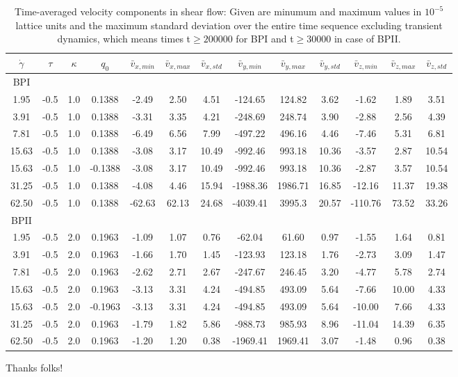 \documentclass[aps,pre,onecolumn,groupedaddress]{revtex4-1}
\begin{document}
\appendix*

\begin{table}
\begin{tabular}{|c|| c | c| c || c |c |c||c| c| c||c| c| c|}
\hline
$\dot{\gamma}$ & $\tau$ & $\kappa$ & $q_0$ & $\bar{v}_{x,min}$ & $\bar{v}_{x,max}$ & $\bar{v}_{x,std}$ & $\bar{v}_{y,min}$ & $\bar{v}_{y,max}$ & $\bar{v}_{y,std}$ & $\bar{v}_{z,min}$ & $\bar{v}_{z,max}$ & $\bar{v}_{z,std}$ \\
\hline
BPI \\
\hline
1.95 & -0.5 & 1.0 &0.1388 & -2.49 &2.50 &4.51 &-124.65 &124.82 &3.62 &-1.62 &1.89 &3.51 \\
3.91 & -0.5 & 1.0 &0.1388 & -3.31 &3.35 &4.21 &-248.69 &248.74 &3.90 &-2.88 &2.56 &4.39 \\
7.81 & -0.5 & 1.0 &0.1388 &-6.49 &6.56 &7.99 &-497.22 &496.16 &4.46 &-7.46 &5.31 &6.81 \\ 
15.63 & -0.5 & 1.0 &0.1388 &-3.08 &3.17 &10.49 &-992.46 &993.18 &10.36 &-3.57 &2.87 &10.54 \\
15.63 & -0.5 & 1.0 &-0.1388 &-3.08 &3.17 &10.49 &-992.46 &993.18 &10.36 &-2.87 &3.57 &10.54 \\
31.25 & -0.5 & 1.0 &0.1388 &-4.08 &4.46 &15.94 & -1988.36 &1986.71 &16.85 &-12.16 &11.37 &19.38\\
62.50 & -0.5 & 1.0 &0.1388 & -62.63 & 62.13 & 24.68 & -4039.41 &3995.3  & 20.57 &-110.76  &73.52 & 33.26 \\
\hline
BPII \\
\hline
1.95 & -0.5 & 2.0 & 0.1963 & -1.09 &1.07 & 0.76 &  -62.04  &61.60 & 0.97 & -1.55 &1.64 & 0.81\\
3.91 & -0.5 & 2.0 & 0.1963&-1.66 &1.70 & 1.45 &-123.93 &123.18 & 1.76 &-2.73 &3.09 &1.47\\
7.81 &  -0.5 & 2.0 &0.1963& -2.62 &2.71 & 2.67 &-247.67 &246.45 & 3.20 &-4.77 &5.78 &2.74\\
15.63 & -0.5 & 2.0 & 0.1963&-3.13 &3.31 &4.24 &-494.85 &493.09 & 5.64 &-7.66 &10.00 &4.33\\
15.63 & -0.5 & 2.0 &-0.1963& -3.13 &3.31 &4.24 &-494.85 &493.09 & 5.64 &-10.00 &7.66 &4.33\\
31.25 & -0.5 & 2.0 &0.1963 &-1.79 &1.82 &5.86 &-988.73 &985.93 &8.96  &-11.04 &14.39 &6.35\\
62.50 & -0.5 & 2.0 &0.1963 & -1.20 & 1.20 & 0.38 & -1969.41  & 1969.41 & 3.07 &-1.48 &0.96 &0.38 \\
\hline
\end{tabular}
\caption{Time-averaged velocity components in shear flow: Given are minumum and maximum values in $10^{-5}$ lattice units and the maximum standard deviation over the entire time sequence excluding transient dynamics, which means times t$\ge 200000$ for BPI and t$\ge 30000$ in case of BPII.
\label{table1}}
\end{table}

\begin{acknowledgments}
Thanks folks!
\end{acknowledgments}


\end{document}
